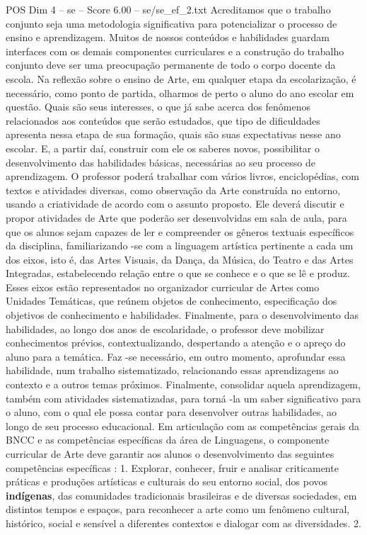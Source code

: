 \begin{textsample}{POS Dim 4 – se – Score 6.00 – se/se\_ef\_2.txt}
Acreditamos que o trabalho conjunto seja uma metodologia significativa para potencializar o processo de ensino e aprendizagem.
Muitos de nossos conteúdos e habilidades guardam interfaces com os demais componentes curriculares e a construção do trabalho conjunto deve ser uma preocupação permanente de todo o corpo docente da escola.
Na reflexão sobre o ensino de Arte, em qualquer etapa da escolarização, é necessário, como ponto de partida, olharmos de perto o aluno do ano escolar em questão.
Quais são seus interesses, o que já sabe acerca dos fenômenos relacionados aos conteúdos que serão estudados, que tipo de dificuldades apresenta nessa etapa de sua formação, quais são suas expectativas nesse ano escolar.
E, a partir daí, construir com ele os saberes novos, possibilitar o desenvolvimento das habilidades básicas, necessárias ao seu processo de aprendizagem.
O professor poderá trabalhar com vários livros, enciclopédias, com textos e atividades diversas, como observação da Arte construída no entorno, usando a criatividade de acordo com o assunto proposto.
Ele deverá discutir e propor atividades de Arte que poderão ser desenvolvidas em sala de aula, para que os alunos sejam capazes de ler e compreender os gêneros textuais específicos da disciplina, familiarizando -se com a linguagem artística pertinente a cada um dos eixos, isto é, das Artes Visuais, da Dança, da Música, do Teatro e das Artes Integradas, estabelecendo relação entre o que se conhece e o que se lê e produz.
Esses eixos estão representados no organizador curricular de Artes como Unidades Temáticas, que reúnem objetos de conhecimento, especificação dos objetivos de conhecimento e habilidades.
Finalmente, para o desenvolvimento das habilidades, ao longo dos anos de escolaridade, o professor deve mobilizar conhecimentos prévios, contextualizando, despertando a atenção e o apreço do aluno para a temática.
Faz -se necessário, em outro momento, aprofundar essa habilidade, num trabalho sistematizado, relacionando essas aprendizagens ao contexto e a outros temas próximos.
Finalmente, consolidar aquela aprendizagem, também com atividades sistematizadas, para torná -la um saber significativo para o aluno, com o qual ele possa contar para desenvolver outras habilidades, ao longo de seu processo educacional.
Em articulação com as competências gerais da BNCC e as competências específicas da área de Linguagens, o componente curricular de Arte deve garantir aos alunos o desenvolvimento das seguintes competências específicas : 1.
Explorar, conhecer, fruir e analisar criticamente práticas e produções artísticas e culturais do seu entorno social, dos povos \textbf{indígenas}, das comunidades tradicionais brasileiras e de diversas sociedades, em distintos tempos e espaços, para reconhecer a arte como um fenômeno cultural, histórico, social e sensível a diferentes contextos e dialogar com as diversidades. 2.

\end{textsample}
